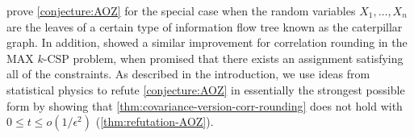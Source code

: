 \documentclass[11pt, oneside, english]{article}
\newcommand{\bE}{\mathbb{E}}
\newcommand{\Cov}{\mathrm{Cov}}
\newcommand{\E}{\bE}      %
\newtheorem{theorem}{Theorem}[section]
\theoremstyle{definition}
\theoremstyle{plain}
\begin{document}
\cite{allen2015conditioning} prove \cref{conjecture:AOZ} for the special case when the random variables $X_1,\dots,X_n$ are the leaves of a certain type of information flow tree known as the caterpillar graph. In addition, \cite{manurangsi2017birthday} showed a similar improvement for correlation rounding in the MAX $k$-CSP problem, when promised that there exists an assignment satisfying all of the constraints. As described in the introduction, we use ideas from statistical physics to refute \cref{conjecture:AOZ} in essentially the strongest possible form by showing that \cref{thm:covariance-version-corr-rounding} does not hold with $0\leq t\leq o(1/\epsilon^2)$ (\cref{thm:refutation-AOZ}). 

\end{document}

